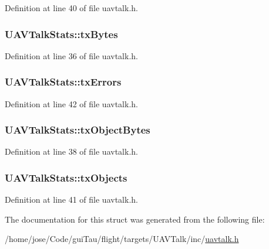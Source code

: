 Definition at line 40 of file uavtalk.\-h.

\hypertarget{struct_u_a_v_talk_stats_a7d5a1c5d207383ebd5b62b27b78ec264}{
\subsubsection[{tx\-Bytes}]{ U\-A\-V\-Talk\-Stats\-::tx\-Bytes}}\label{struct_u_a_v_talk_stats_a7d5a1c5d207383ebd5b62b27b78ec264}


Definition at line 36 of file uavtalk.\-h.

\hypertarget{struct_u_a_v_talk_stats_af325955ebac8f234145deefefdea9dbe}{
\subsubsection[{tx\-Errors}]{ U\-A\-V\-Talk\-Stats\-::tx\-Errors}}\label{struct_u_a_v_talk_stats_af325955ebac8f234145deefefdea9dbe}


Definition at line 42 of file uavtalk.\-h.

\hypertarget{struct_u_a_v_talk_stats_ad2f1c1147e9062cfeaeaf21ea076434c}{
\subsubsection[{tx\-Object\-Bytes}]{ U\-A\-V\-Talk\-Stats\-::tx\-Object\-Bytes}}\label{struct_u_a_v_talk_stats_ad2f1c1147e9062cfeaeaf21ea076434c}


Definition at line 38 of file uavtalk.\-h.

\hypertarget{struct_u_a_v_talk_stats_a7f067b3f89c3ac3c274eb05f71557a6a}{
\subsubsection[{tx\-Objects}]{ U\-A\-V\-Talk\-Stats\-::tx\-Objects}}\label{struct_u_a_v_talk_stats_a7f067b3f89c3ac3c274eb05f71557a6a}


Definition at line 41 of file uavtalk.\-h.



The documentation for this struct was generated from the following file\-:\begin{DoxyCompactItemize}
\item 
/home/jose/\-Code/gui\-Tau/flight/targets/\-U\-A\-V\-Talk/inc/\hyperlink{uavtalk_8h}{uavtalk.\-h}\end{DoxyCompactItemize}
